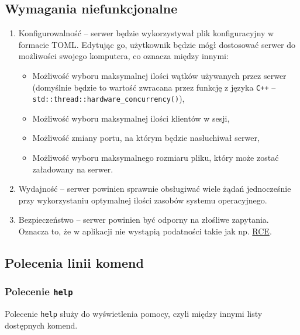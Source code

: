 \documentclass[8pt,a4paper]{article}
\begin{document}
\subsection{Wymagania niefunkcjonalne}
\begin{enumerate}
    \item Konfigurowalność -- serwer będzie wykorzystywał plik konfiguracyjny w formacie TOML. Edytując go, użytkownik będzie mógł dostosować serwer do możliwości swojego komputera, co oznacza między innymi:
    \begin{itemize}
        \item Możliwość wyboru maksymalnej ilości wątków używanych przez serwer (domyślnie będzie to wartość zwracana przez funkcję z języka \texttt{C++} -- \texttt{std::thread::hardware\_concurrency()}),
        \item Możliwość wyboru maksymalnej ilości klientów w sesji,
        \item Możliwość zmiany portu, na którym będzie nasłuchiwał serwer,
        \item Możliwość wyboru maksymalnego rozmiaru pliku, który może zostać załadowany na serwer.
    \end{itemize}

    \item Wydajność -- serwer powinien sprawnie obsługiwać wiele żądań jednocześnie przy wykorzystaniu optymalnej ilości zasobów systemu operacyjnego.

    \item Bezpieczeństwo -- serwer powinien być odporny na złośliwe zapytania. Oznacza to, że w aplikacji nie wystąpią podatności takie jak np. \href{https://en.wikipedia.org/wiki/Arbitrary_code_execution}{RCE}.
\end{enumerate}

\subsection{Polecenia linii komend}

\subsubsection{Polecenie \texttt{help}}
Polecenie \texttt{help} służy do wyświetlenia pomocy, czyli między innymi listy dostępnych komend.
\end{document}

